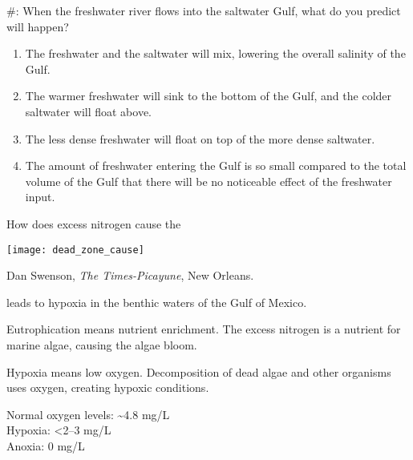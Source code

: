 \documentclass[t]{beamer}
\newcommand*{\cq}[1]{%
	\#{\lining#1}:%
}
\begin{document}
%
\begin{frame}{\cq{6} When the freshwater river flows into the saltwater Gulf, what do you predict will happen?}

	\begin{enumerate}
		\item The freshwater and the saltwater will mix, lowering the overall salinity of the Gulf.
	
		\item The warmer freshwater will sink to the bottom of the Gulf, and the colder saltwater will float above.

		\item The less dense freshwater will float on top of the more dense saltwater.
		
		\item The amount of freshwater entering the Gulf is so small compared to the total volume of the Gulf that there will be no noticeable effect of the freshwater input.
	\end{enumerate}
	
\end{frame}
%
%
%
%	
%	
%	
%
%	

\begin{frame}{How does excess nitrogen cause the }

	{\centering \texttt{[image: dead\_zone\_cause]}\par
	}
	
	\vfilll
	
	\tiny Dan Swenson, \textit{The Times-Picayune}, New Orleans.	
\end{frame}
%
\begin{frame}{ leads to hypoxia in the benthic waters of the Gulf of Mexico.}

	\hangpara Eutrophication means nutrient enrichment. The excess nitrogen is a nutrient for marine algae, causing the algae bloom.
	
	\hangpara Hypoxia means low oxygen. Decomposition of dead algae and other organisms uses oxygen, creating hypoxic conditions.
	
	\hangpara Normal oxygen levels: \textasciitilde4.8 mg/L\\
	Hypoxia: \textless 2–3 mg/L\\
	Anoxia: 0 mg/L
\end{frame}
%
\end{document}
